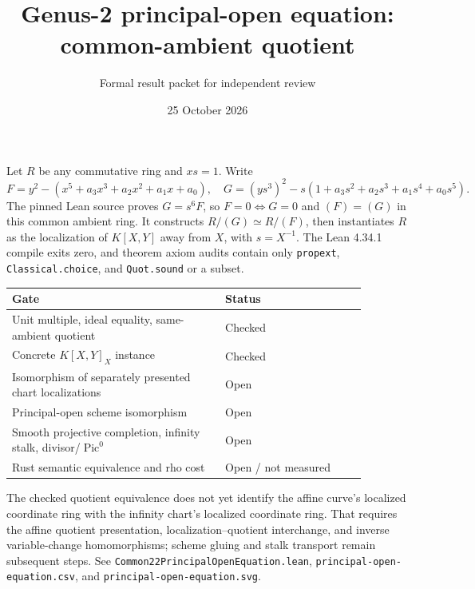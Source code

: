 \documentclass[11pt]{article}
\title{Genus-2 principal-open equation: common-ambient quotient}
\author{Formal result packet for independent review}
\date{25 October 2026}
\begin{document}
\maketitle
Let $R$ be any commutative ring and $xs=1$. Write
\[F=y^2-(x^5+a_3x^3+a_2x^2+a_1x+a_0),\quad
G=(ys^3)^2-s(1+a_3s^2+a_2s^3+a_1s^4+a_0s^5).\]
The pinned Lean source proves $G=s^6F$, so $F=0\iff G=0$ and $(F)=(G)$ in this common ambient ring. It constructs $R/(G)\simeq R/(F)$, then instantiates $R$ as the localization of $K[X,Y]$ away from $X$, with $s=X^{-1}$. The Lean 4.34.1 compile exits zero, and theorem axiom audits contain only \texttt{propext}, \texttt{Classical.choice}, and \texttt{Quot.sound} or a subset.

\begin{center}\begin{tabular}{p{0.53\linewidth}p{0.35\linewidth}}\toprule
Gate & Status\\\midrule
Unit multiple, ideal equality, same-ambient quotient & Checked\\
Concrete $K[X,Y]_X$ instance & Checked\\
Isomorphism of separately presented chart localizations & Open\\
Principal-open scheme isomorphism & Open\\
Smooth projective completion, infinity stalk, divisor/$\operatorname{Pic}^0$ & Open\\
Rust semantic equivalence and rho cost & Open / not measured\\\bottomrule\end{tabular}\end{center}

\noindent The checked quotient equivalence does not yet identify the affine curve's localized coordinate ring with the infinity chart's localized coordinate ring. That requires the affine quotient presentation, localization--quotient interchange, and inverse variable-change homomorphisms; scheme gluing and stalk transport remain subsequent steps. See \texttt{Common22PrincipalOpenEquation.lean}, \texttt{principal-open-equation.csv}, and \texttt{principal-open-equation.svg}.
\end{document}
